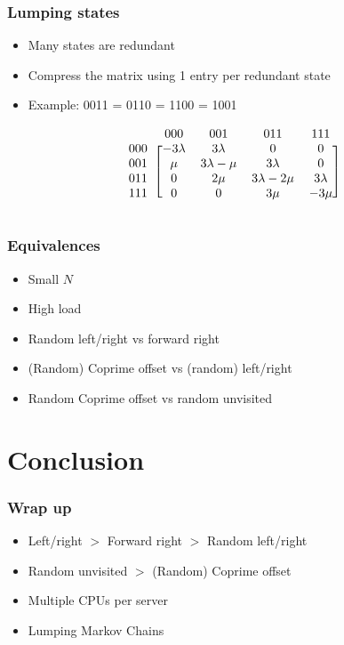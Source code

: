 \documentclass[compress]{beamer}
\begin{document}
\begin{frame}
\frametitle{Lumping states}
\begin{itemize}
 \item Many states are redundant
 \item Compress the matrix using 1 entry per redundant state
 \item Example: 0011 = 0110 = 1100 = 1001
\end{itemize}
\vspace{2em}\[\begin{blockarray}{ccccc}
    & 000 & 001 & 011 & 111 \\
    \begin{block}{c[cccc]}
    000 & -3\lambda & 3\lambda & 0 & 0 \\
    001 & \mu & 3\lambda-\mu & 3\lambda & 0 \\
    011 & 0 & 2\mu & 3\lambda-2\mu & 3\lambda \\
    111 & 0 & 0 & 3\mu & -3\mu \\
    \end{block}
\end{blockarray}\]
\end{frame}


\begin{frame}
\frametitle{Equivalences}
\begin{itemize}
 \item Small $N$
 \item High load
 \item Random left/right vs forward right
 \item (Random) Coprime offset vs (random) left/right
 \item Random Coprime offset vs random unvisited
\end{itemize}

\end{frame}

\section{Conclusion}
\begin{frame}
\frametitle{Wrap up}
\begin{itemize}
 \item Left/right $>$ Forward right $>$ Random left/right
 \item Random unvisited $>$ (Random) Coprime offset
 \item Multiple CPUs per server
 \item Lumping Markov Chains
\end{itemize}

\end{frame}
\end{document}

